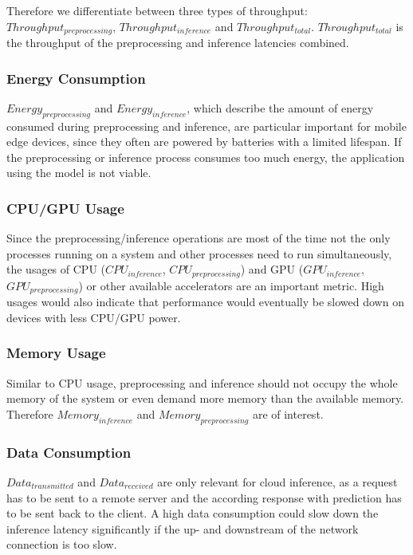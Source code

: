 Therefore we differentiate between three types of throughput: $Throughput_{preprocessing}$, $Throughput_{inference}$ and $Throughput_{total}$.
$Throughput_{total}$ is the throughput of the preprocessing and inference latencies combined.



\subsubsection{Energy Consumption}
$Energy_{preprocessing}$ and $Energy_{inference}$, which describe the amount of energy consumed during preprocessing and inference, are particular important for mobile edge devices, since they often are powered by batteries with a limited lifespan. If the preprocessing or inference process consumes too much energy, the application using the model is not viable.


\subsubsection{CPU/GPU Usage}
Since the preprocessing/inference operations are most of the time not the only processes running on a system and other processes need to run simultaneously, the usages of CPU ($CPU_{inference}$, $CPU_{preprocessing}$) and GPU ($GPU_{inference}$, $GPU_{preprocessing}$) or other available accelerators are an important metric.
High usages would also indicate that performance would eventually be slowed down on devices with less CPU/GPU power.


\subsubsection{Memory Usage}
Similar to CPU usage, preprocessing and inference should not occupy the whole memory of the system or even demand more memory than the available memory. Therefore $Memory_{inference}$ and $Memory_{preprocessing}$ are of interest.

\subsubsection{Data Consumption}
$Data_{transmitted}$ and $Data_{received}$ are only relevant for cloud inference, as a request has to be sent to a remote server and the according response with prediction has to be sent back to the client. A high data consumption could slow down the inference latency significantly if the up- and downstream of the network connection is too slow. 

